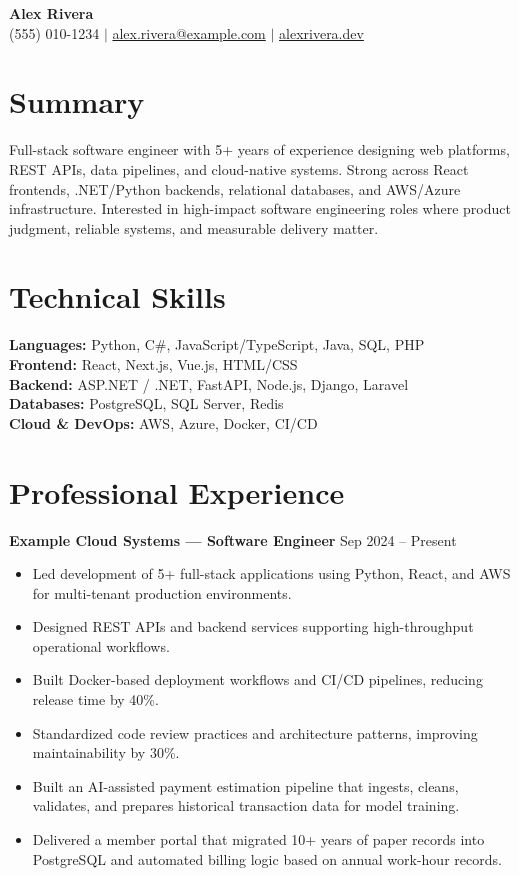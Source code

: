 \documentclass[10pt]{article}
\begin{document}
\begin{center}
    {\LARGE \textbf{Alex Rivera}} \\
    \vspace{3pt}
    (555) 010-1234 \enspace$|$\enspace
    \href{mailto:alex.rivera@example.com}{alex.rivera@example.com} \enspace$|$\enspace
    \href{https://alexrivera.dev}{alexrivera.dev}
\end{center}

\section*{Summary}
Full-stack software engineer with 5+ years of experience designing web platforms, REST APIs, data pipelines, and cloud-native systems. Strong across React frontends, .NET/Python backends, relational databases, and AWS/Azure infrastructure. Interested in high-impact software engineering roles where product judgment, reliable systems, and measurable delivery matter.

\section*{Technical Skills}
\textbf{Languages:} Python, C\#, JavaScript/TypeScript, Java, SQL, PHP \\
\textbf{Frontend:} React, Next.js, Vue.js, HTML/CSS \\
\textbf{Backend:} ASP.NET / .NET, FastAPI, Node.js, Django, Laravel \\
\textbf{Databases:} PostgreSQL, SQL Server, Redis \\
\textbf{Cloud \& DevOps:} AWS, Azure, Docker, CI/CD

\section*{Professional Experience}

\textbf{Example Cloud Systems --- Software Engineer} \hfill Sep 2024 -- Present
\begin{itemize}
    \item Led development of 5+ full-stack applications using Python, React, and AWS for multi-tenant production environments.
    \item Designed REST APIs and backend services supporting high-throughput operational workflows.
    \item Built Docker-based deployment workflows and CI/CD pipelines, reducing release time by 40\%.
    \item Standardized code review practices and architecture patterns, improving maintainability by 30\%.
    \item Built an AI-assisted payment estimation pipeline that ingests, cleans, validates, and prepares historical transaction data for model training.
    \item Delivered a member portal that migrated 10+ years of paper records into PostgreSQL and automated billing logic based on annual work-hour records.
\end{itemize}
\end{document}
